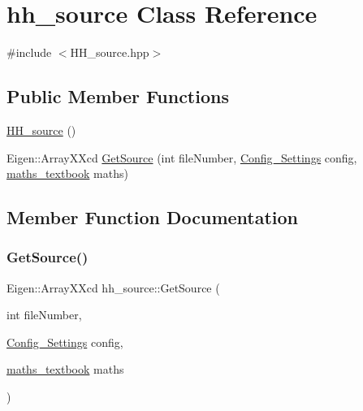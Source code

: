 \hypertarget{classhh__source}{}\section{hh\+\_\+source Class Reference}
\label{classhh__source}


{\ttfamily \#include $<$H\+H\+\_\+source.\+hpp$>$}

\subsection*{Public Member Functions}
\begin{DoxyCompactItemize}
\item 
\hyperlink{classhh__source_a64806f541def8b1bdee5666d96ee7152}{H\+H\+\_\+source} ()
\item 
Eigen\+::\+Array\+X\+Xcd \hyperlink{classhh__source_aa658c3bdf0de4dc034f30b4df1ad8b4b}{Get\+Source} (int file\+Number, \hyperlink{class_config___settings}{Config\+\_\+\+Settings} config, \hyperlink{classmaths__textbook}{maths\+\_\+textbook} maths)
\end{DoxyCompactItemize}


\subsection{Member Function Documentation}
\mbox{\label{classhh__source_aa658c3bdf0de4dc034f30b4df1ad8b4b}} 
\subsubsection{\texorpdfstring{Get\+Source()}{GetSource()}}
{\footnotesize\ttfamily Eigen\+::\+Array\+X\+Xcd hh\+\_\+source\+::\+Get\+Source (\begin{DoxyParamCaption}\item[{int}]{file\+Number,  }\item[{\hyperlink{class_config___settings}{Config\+\_\+\+Settings}}]{config,  }\item[{\hyperlink{classmaths__textbook}{maths\+\_\+textbook}}]{maths }\end{DoxyParamCaption})}

\mbox{\label{classhh__source_a64806f541def8b1bdee5666d96ee7152}} 
